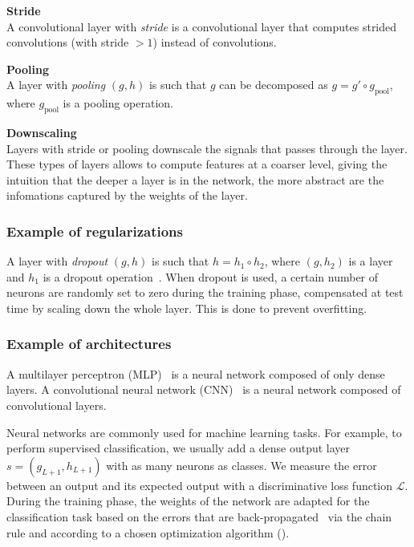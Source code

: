 \begin{definition}\textbf{Stride}\\
A convolutional layer with \emph{stride} is a convolutional layer that computes strided convolutions (with stride $> 1$) instead of convolutions.
\end{definition}

\begin{definition}\textbf{Pooling}\\
A layer with \textit{pooling} $(g,h)$ is such that $g$ can be decomposed as $g = g' \circ g_\text{pool}$, where $g_\text{pool}$ is a pooling operation.
\end{definition}

\begin{remark}\textbf{Downscaling}\\
Layers with stride or pooling downscale the signals that passes through the layer. These types of layers allows to compute features at a coarser level, giving the intuition that the deeper a layer is in the network, the more abstract are the infomations captured by the weights of the layer.
\end{remark}


\subsubsection{Example of regularizations}

A layer with \textit{dropout} $(g,h)$ is such that $h = h_1 \circ h_2$, where $(g,h_2)$ is a layer and $h_1$ is a dropout operation~\citep{srivastava2014dropout}. When dropout is used, a certain number of neurons are randomly set to zero during the training phase, compensated at test time by scaling down the whole layer. This is done to prevent overfitting.

\subsubsection{Example of architectures}
\label{sec:nn_arch}


A multilayer perceptron (MLP)~\citep{hornik1989multilayer} is a neural network composed of only dense layers.
A convolutional neural network (CNN)~\citep{lecun1998gradient} is a neural network composed of convolutional layers.

Neural networks are commonly used for machine learning tasks. For example, to perform supervised classification, we usually add a dense output layer $s=(g_{L+1},h_{L+1})$ with as many neurons as classes. We measure the error between an output and its expected output with a discriminative loss function $\mathcal{L}$. During the training phase, the weights of the network are adapted for the classification task based on the errors that are back-propagated~\citep{hornik1989multilayer} via the chain rule and according to a chosen optimization algorithm (\eg \cite{bottou2010large}).
